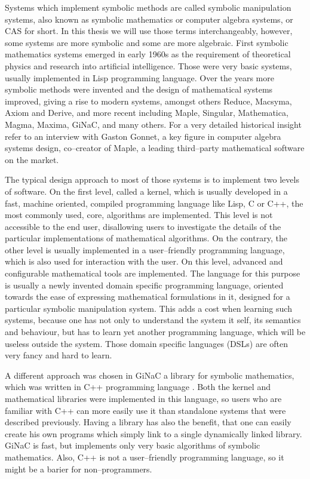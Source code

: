 Systems which implement symbolic methods are called symbolic manipulation systems, also known
as symbolic mathematics or computer algebra systems, or CAS for short. In this thesis we will
use those terms interchangeably, however, some systems are more symbolic and some are more
algebraic. First symbolic mathematics systems emerged in early 1960s as the requirement of
theoretical physics and research into artificial intelligence. Those were very basic systems,
usually implemented in Lisp programming language. Over the years more symbolic methods were
invented and the design of mathematical systems improved, giving a rise to modern systems,
amongst others Reduce, Macsyma, Axiom and Derive, and more recent including Maple, Singular,
Mathematica, Magma, Maxima, GiNaC, and many others. For a very detailed historical insight
refer to an interview \cite{Haigh2005interview} with Gaston Gonnet, a key figure in computer
algebra systems design, co--creator of Maple, a leading third--party mathematical software
on the market.

The typical design approach to most of those systems is to implement two levels of software.
On the first level, called a kernel, which is usually developed in a fast, machine oriented,
compiled programming language like Lisp, C or C++, the most commonly used, core, algorithms
are implemented. This level is not accessible to the end user, disallowing users to investigate
the details of the particular implementations of mathematical algorithms. On the contrary,
the other level is usually implemented in a user--friendly programming language, which is also
used for interaction with the user. On this level, advanced and configurable mathematical tools
are implemented. The language for this purpose is usually a newly invented domain specific
programming language, oriented towards the ease of expressing mathematical formulations in it,
designed for a particular symbolic manipulation system. This adds a cost when learning such
systems, because one has not only to understand the system it self, its semantics and behaviour,
but has to learn yet another programming language, which will be useless outside the system.
Those domain specific languages (DSLs) are often very fancy and hard to learn.

A different approach was chosen in GiNaC a library for symbolic mathematics, which was written
in C++ programming language \cite{Frink2001large}. Both the kernel and mathematical libraries were
implemented in this language, so users who are familiar with C++ can more easily use it than
standalone systems that were described previously. Having a library has also the benefit, that
one can easily create his own programs which simply link to a single dynamically linked library.
GiNaC is fast, but implements only very basic algorithms of symbolic mathematics. Also, C++ is
not a user--friendly programming language, so it might be a barier for non--programmers.

